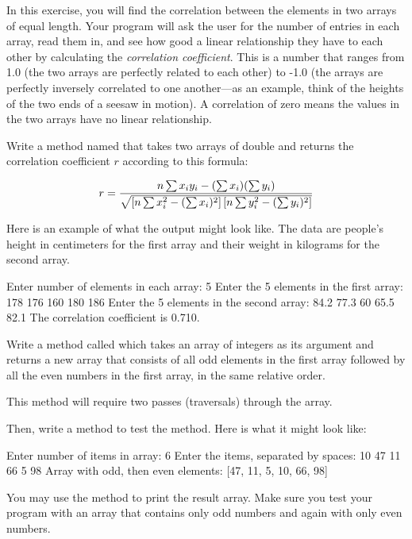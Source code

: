 \begin{exercise}
In this exercise, you will find the correlation between the elements in two arrays of equal length.
Your program will ask the user for the number of entries in each array, read them in, and see how good a linear relationship they have to each other by calculating the {\em correlation coefficient}. This is a number that ranges from 1.0 (the two arrays are perfectly related to each other) to -1.0 (the arrays are perfectly inversely correlated to one another---as an example, think of the heights of the two ends of a seesaw in motion). A correlation of zero means the values in the two arrays have no linear relationship.

Write a method named  that takes two arrays of double and returns the correlation coefficient $r$ according to this formula:

\begin{equation*}
r = {{n \sum x_iy_i - (\sum x_i)(\sum y_i)} \over {\sqrt {\left[n \sum x_i^2 - (\sum x_i)^2\right]\left[n \sum y_i^2 - (\sum y_i)^2\right]}}}
\end{equation*}

Here is an example of what the output might look like. The data are people's height in centimeters for the first array and their weight in kilograms for the second array.

\begin{stdout}
Enter number of elements in each array: 5
Enter the 5 elements in the first array: 178 176 160 180 186
Enter the 5 elements in the second array: 84.2 77.3 60 65.5 82.1
The correlation coefficient is 0.710.
\end{stdout}

\end{exercise}

\begin{exercise}
Write a method called  which takes an array of integers as its argument and returns a new array that consists of all odd elements in the first array followed by all the even numbers in the first array, in the same relative order.

This method will require two passes (traversals) through the array.

Then, write a  method to test the  method. Here is what it
might look like:

\begin{stdout}
Enter number of items in array: 6
Enter the items, separated by spaces: 10 47 11 66 5 98
Array with odd, then even elements: [47, 11, 5, 10, 66, 98]
\end{stdout}

You may use the  method to print the result array. Make sure you test your program with an array that contains only odd numbers and again with only even numbers.

\end{exercise}

